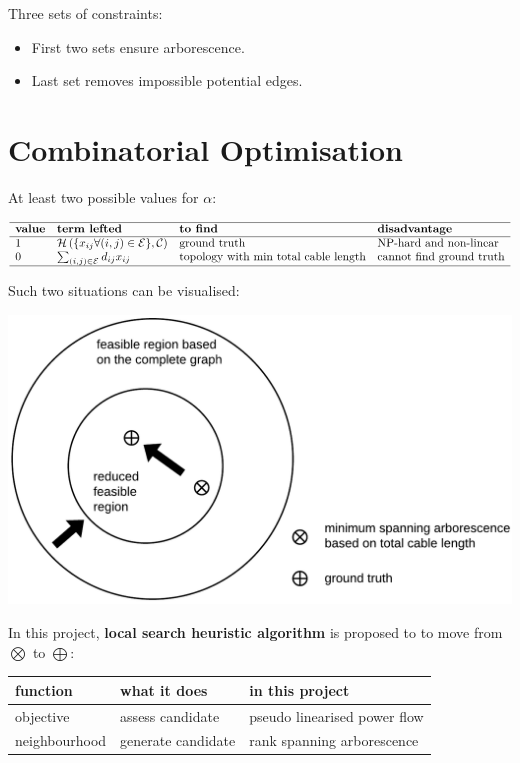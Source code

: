 \documentclass[
]{book}
\providecommand{\tightlist}{%
  \setlength{\itemsep}{0pt}\setlength{\parskip}{0pt}}
\begin{document}
Three sets of constraints:

\begin{itemize}
\tightlist
\item
  First two sets ensure arborescence.
\item
  Last set removes impossible potential edges.
\end{itemize}

\hypertarget{combinatorial}{%
\section{Combinatorial Optimisation}\label{combinatorial}}

At least two possible values for \(\alpha\):

\[
\begin{array}{llll}
  \hline
  \textbf{value} & \textbf{term lefted} & \textbf{to find}
  & \textbf{disadvantage} \\
  \hline
  1
  & \mathcal{H}
  \left(\{x_{i j} \forall (i, j) \in \mathcal{E} \}, \mathcal{C} \right)
  & \text{ground truth}
  & \text{NP-hard and non-linear} \\
  0
  & \sum_{(i, j) \in \mathcal{E}} d_{i j} x_{i j}
  & \text{topology with min total cable length}
  & \text{cannot find ground truth} \\
  \hline
\end{array}
\]

Such two situations can be visualised:

\begin{center}\includegraphics[width=0.7\linewidth]{Pictures/figFeasibleRegion} \end{center}

In this project, \textbf{local search heuristic algorithm} is proposed to to move
from \(\bigotimes\) to \(\bigoplus\):

\begin{table}[H]
\centering
\begin{tabular}[t]{l|l|l}
\hline
function & what it does & in this project\\
\hline
objective & assess candidate & pseudo linearised power flow\\
\hline
neighbourhood & generate candidate & rank spanning arborescence\\
\hline
\end{tabular}
\end{table}
\end{document}
